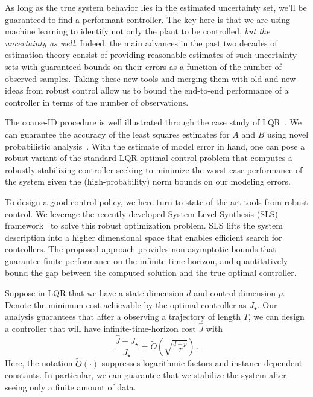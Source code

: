\documentclass[11pt]{article}
\numberwithin{equation}{section}
\begin{document}
As long as the true system behavior lies in the estimated uncertainty set, we'll be guaranteed to find a performant controller.  The key here is that we are using machine learning to identify not only the plant to be controlled, \emph{but the uncertainty as well}. Indeed, the main advances in the past two decades of estimation theory consist of providing reasonable estimates of such uncertainty sets with guaranteed bounds on their errors as a function of the number of observed samples. Taking these new tools and merging them with old and new ideas from robust control allow us to bound the end-to-end performance of a controller in terms of the number of observations.

The coarse-ID procedure is well illustrated through the case study of LQR~\cite{Dean17}. We can guarantee the accuracy of the least squares estimates for $A$ and $B$ using novel probabilistic analysis~\cite{Simchowitz18a}. With the estimate of model error in hand, one can pose a robust variant of the standard LQR optimal control problem that computes a robustly stabilizing controller seeking to minimize the worst-case performance of the system given the (high-probability) norm bounds on our modeling errors.  

To design a good control policy, we here turn to state-of-the-art tools from robust control. We leverage the recently developed System Level Synthesis (SLS) framework~\cite{Matni17,Wang16} to solve this robust optimization problem. SLS lifts the system description into a higher dimensional space that enables efficient search for controllers.  The proposed approach provides non-asymptotic bounds that guarantee finite performance on the infinite time horizon, and quantitatively bound the gap between the computed solution and the true optimal controller.

Suppose in LQR that we have a state dimension $d$ and control dimension $p$. Denote the minimum cost achievable by the optimal controller as $J_\star$. Our analysis guarantees that after a observing a trajectory of length $T$, we can design a controller that will have infinite-time-horizon cost $\hat{J}$ with 
\begin{equation*}
\frac{\hat{J}-J_\star}{J_\star} = \tilde{O}\left(\sqrt{\tfrac{d+p}{T}}\right)\,.
\end{equation*}
Here, the notation $\tilde{O}(\cdot)$ suppresses logarithmic factors and instance-dependent constants.  In particular, we can guarantee that we stabilize the system after seeing only a finite amount of data.
\end{document}
